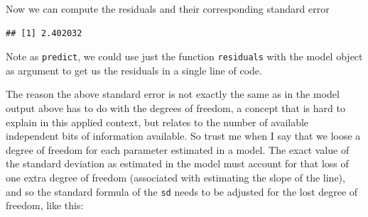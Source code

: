 \documentclass[
]{book}
\newenvironment{Shaded}{\begin{snugshade}}{\end{snugshade}}
\newcommand{\CommentTok}[1]{\textcolor[rgb]{0.56,0.35,0.01}{\textit{#1}}}
\newcommand{\DecValTok}[1]{\textcolor[rgb]{0.00,0.00,0.81}{#1}}
\newcommand{\FunctionTok}[1]{\textcolor[rgb]{0.13,0.29,0.53}{\textbf{#1}}}
\newcommand{\NormalTok}[1]{#1}
\newcommand{\OtherTok}[1]{\textcolor[rgb]{0.56,0.35,0.01}{#1}}
\newcommand{\SpecialCharTok}[1]{\textcolor[rgb]{0.81,0.36,0.00}{\textbf{#1}}}
\begin{document}
\begin{Shaded}
\end{Shaded}

Now we can compute the residuals and their corresponding standard error

\begin{Shaded}
\end{Shaded}

\begin{verbatim}
## [1] 2.402032
\end{verbatim}

Note as \texttt{predict}, we could use just the function \texttt{residuals} with the model object as argument to get us the residuals in a single line of code.

The reason the above standard error is not exactly the same as in the model output above has to do with the degrees of freedom, a concept that is hard to explain in this applied context, but relates to the number of available independent bits of information available. So trust me when I say that we loose a degree of freedom for each parameter estimated in a model. The exact value of the standard deviation as estimated in the model must account for that loss of one extra degree of freedom (associated with estimating the slope of the line), and so the standard formula of the \texttt{sd} needs to be adjusted for the lost degree of freedom, like this:
\end{document}
